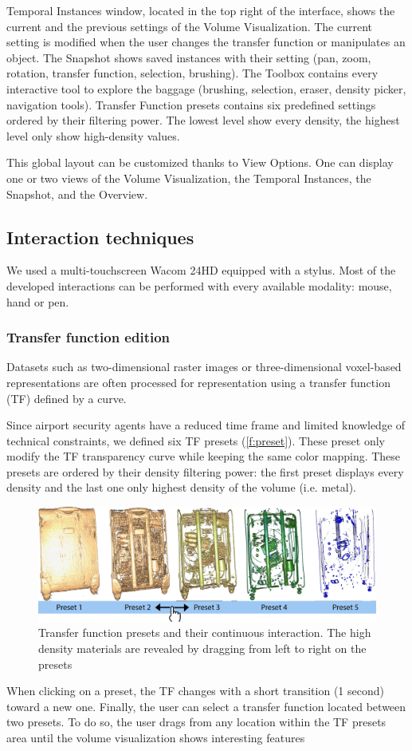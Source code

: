 Temporal Instances window, located in the top right of the interface, shows the current and the previous settings of the Volume Visualization. The current setting is modified when the user changes the transfer function or manipulates an object.
The Snapshot shows saved instances with their setting (pan, zoom, rotation, transfer function, selection, brushing).
The Toolbox contains every interactive tool to explore the baggage (brushing, selection, eraser, density picker, navigation tools).
Transfer Function presets contains six predefined settings ordered by their filtering power. The lowest level show every density, the highest level only show high-density values. 

This global layout can be customized thanks to View Options. One can display one or two views of the Volume Visualization, the Temporal Instances, the Snapshot, and the Overview.

\subsection{Interaction techniques}

We used a multi-touchscreen Wacom 24HD equipped with a stylus. Most of the developed interactions can be performed with every available modality: mouse, hand or pen.
\subsubsection{ Transfer function edition}	
Datasets such as two-dimensional raster images or three-dimensional voxel-based representations are often processed for representation using a transfer function (TF) defined by a curve. 

Since airport security agents have a reduced time frame and limited knowledge of technical constraints, we defined six TF presets (\autoref{f:preset}). These preset only modify the TF transparency curve while keeping the same color mapping. These presets are ordered by their density filtering power: the first preset displays every density and the last one only highest density of the volume (i.e. metal). 

\begin{figure}
   \centering   
	\includegraphics[width=15cm]{Figures/preset.png}
	\caption{ Transfer function presets and their continuous interaction. The high density materials are revealed by dragging from left to right on the presets }
	\label{f:preset}
\end{figure}
When clicking on a preset, the TF changes with a short transition (1 second) toward a new one. 
Finally, the user can select a transfer function located between two presets. To do so, the user drags from any location within the TF presets area until the volume visualization shows interesting features 

